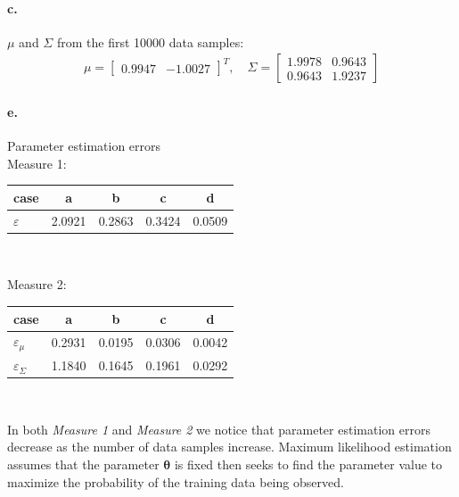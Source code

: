 \documentclass[a4paper]{article}
\begin{document}
\paragraph{c.} $\mu$ and $\Sigma$ from the first 10000 data samples: \\
\begin{align*}
	\mu = \begin{bmatrix}
		0.9947 & -1.0027
	\end{bmatrix}^{T}, \quad
	\Sigma = \begin{bmatrix}
		1.9978  &  0.9643 \\
		0.9643  &  1.9237
	\end{bmatrix}
\end{align*}

\paragraph{e.} Parameter estimation errors \\

Measure 1:
	\begin{tabular}{l *{4}{c}}
			case     &   a    &   b    &   c    &   d    \\ \hline
		$\varepsilon$ & 2.0921 & 0.2863 & 0.3424 & 0.0509
	\end{tabular} \\
\vspace{2em}
 
Measure 2:
	\begin{tabular}{l *{4}{c}}
				case            &   a    &   b    &   c    &   d    \\ \hline
		$\varepsilon _{\mu}$    & 0.2931 & 0.0195 & 0.0306 & 0.0042 \\ 
		$\varepsilon _{\Sigma}$ & 1.1840 & 0.1645 & 0.1961 & 0.0292 
	\end{tabular} \\
\vspace{2em}

In both \emph{Measure 1} and \emph{Measure 2} we notice that parameter estimation errors decrease as the number of data samples increase. Maximum likelihood estimation assumes that the parameter $\boldsymbol{\theta}$ is fixed then seeks to find the parameter value to maximize the probability of the training data being observed.

\end{document}
